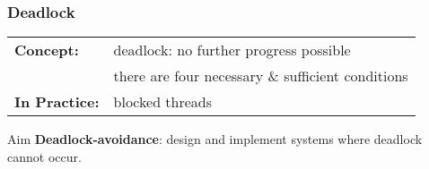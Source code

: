 \begin{frame}
  \frametitle{Deadlock}
  \begin{tcolorbox}[colback=white,colframe=DarkGreen]
    \begin{tabularx}{\linewidth}{l l}
      \textbf{Concept:} & \alert{deadlock}: no further progress possible
      \\
      & there are four necessary \& sufficient conditions
      \\
      \textbf{In Practice:} & blocked threads
    \end{tabularx}
  \end{tcolorbox}

  \begin{minipage}{.4\textwidth}
    \hspace{10cm}
  \end{minipage}
  \begin{minipage}{.54\textwidth}
  \begin{alertblock}{Aim}
    \textbf{Deadlock-avoidance}: design and implement systems where deadlock cannot
    occur.
  \end{alertblock}
  \end{minipage}
\end{frame}

